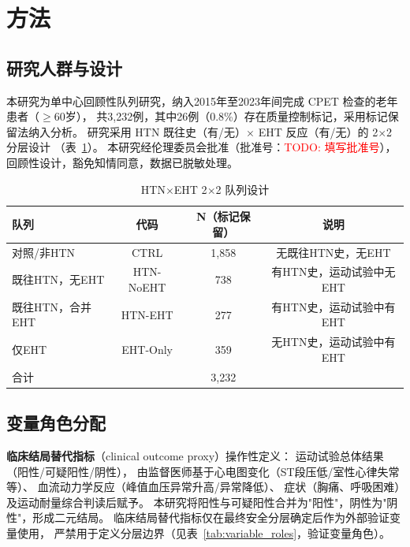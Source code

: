 \documentclass[12pt, a4paper]{ctexart}
\begin{document}
\section{方法}

\subsection{研究人群与设计}

本研究为单中心回顾性队列研究，纳入2015年至2023年间完成 CPET 检查的老年患者（$\geq$60岁），
共3,232例，其中26例（0.8\%）存在质量控制标记，采用标记保留法纳入分析。
研究采用 HTN 既往史（有/无）$\times$ EHT 反应（有/无）的 2$\times$2 分层设计
（表~\ref{tab:cohort_design}）。
本研究经伦理委员会批准（批准号：\textcolor{red}{TODO: 填写批准号}），
回顾性设计，豁免知情同意，数据已脱敏处理。

\begin{table}[htbp]
\centering
\caption{HTN$\times$EHT 2$\times$2 队列设计}
\label{tab:cohort_design}
\begin{tabular}{lccc}
\toprule
队列 & 代码 & N（标记保留）& 说明 \\
\midrule
对照/非HTN & CTRL & 1,858 & 无既往HTN史，无EHT \\
既往HTN，无EHT & HTN-NoEHT & 738 & 有HTN史，运动试验中无EHT \\
既往HTN，合并EHT & HTN-EHT & 277 & 有HTN史，运动试验中有EHT \\
仅EHT & EHT-Only & 359 & 无HTN史，运动试验中有EHT \\
\midrule
合计 & & 3,232 & \\
\bottomrule
\end{tabular}
\end{table}

\subsection{变量角色分配}

\textbf{临床结局替代指标}（clinical outcome proxy）操作性定义：
运动试验总体结果（阳性/可疑阳性/阴性），
由监督医师基于心电图变化（ST段压低/室性心律失常等）、
血流动力学反应（峰值血压异常升高/异常降低）、
症状（胸痛、呼吸困难）及运动耐量综合判读后赋予。
本研究将阳性与可疑阳性合并为"阳性"，阴性为"阴性"，形成二元结局。
临床结局替代指标仅在最终安全分层确定后作为外部验证变量使用，
严禁用于定义分层边界（见表~\ref{tab:variable_roles}，验证变量角色）。
\end{document}
